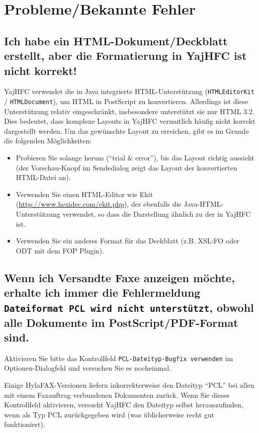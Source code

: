 \documentclass[a4paper,10pt,halfparskip,noparindent]{scrartcl}
\begin{document}
\section{Probleme/Bekannte Fehler}

\subsection{Ich habe ein HTML-Dokument/Deckblatt erstellt, aber die Formatierung in YajHFC ist nicht korrekt!}

YajHFC verwendet die in Java integrierte HTML-Unterstützung (\texttt{HTMLEditorKit} / \texttt{HTMLDocument}), um HTML in PostScript zu konvertieren. Allerdings ist diese Unterstützung relativ eingeschränkt, insbesondere unterstützt sie nur HTML 3.2.\\
Dies bedeutet, dass komplexe Layouts in YajHFC vermutlich häufig nicht korrekt dargestellt werden. Um das gewünschte Layout zu erreichen, gibt es im Grunde die folgenden Möglichkeiten:

\begin{itemize}
 \item Probieren Sie solange herum ("`trial \& error"'), bis das Layout richtig aussieht (der Vorschau-Knopf im Sendedialog zeigt das Layout der konvertierten HTML-Datei an).
 \item Verwenden Sie einen HTML-Editor wie Ekit (\url{http://www.hexidec.com/ekit.php}), der ebenfalls die Java-HTML-Unterstützung verwendet, so dass die Darstellung ähnlich zu der in YajHFC ist.
 \item Verwenden Sie ein anderes Format für das Deckblatt (z.B. XSL:FO oder ODT mit dem FOP Plugin).
\end{itemize}


\subsection{Wenn ich Versandte Faxe anzeigen möchte, erhalte ich immer die Fehlermeldung 
\texttt{Dateiformat PCL wird nicht unterstützt}, obwohl alle Dokumente im PostScript/PDF-Format sind.}

Aktivieren Sie bitte das Kontrollfeld \texttt{PCL-Dateityp-Bugfix verwenden} im Optionen-Dialogfeld und
versuchen Sie es nocheinmal.

Einige HylaFAX-Versionen liefern inkorrekterweise den Dateityp "`PCL"' bei allen
mit einem Faxauftrag verbundenen Dokumenten zurück.
Wenn Sie dieses Kontrollfeld aktivieren, versucht YajHFC den Dateityp selbst herauszufinden,
wenn als Typ PCL zurückgegeben wird (was üblicherweise recht gut funktioniert).
\end{document}
